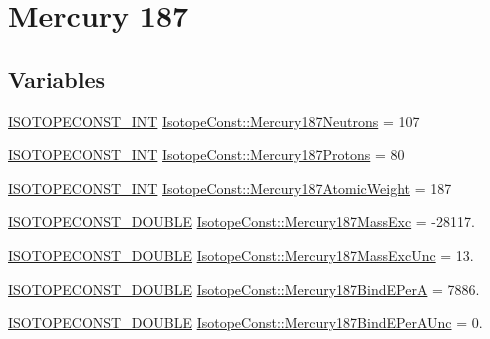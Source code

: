 \hypertarget{group___isotope_const-_mercury-_hg187}{}\section{Mercury 187}
\label{group___isotope_const-_mercury-_hg187}
\subsection*{Variables}
\begin{DoxyCompactItemize}
\item 
\mbox{\hyperlink{group___isotope_const-_macros_ga5f18360b3e99483a35c32d789e62621c}{I\+S\+O\+T\+O\+P\+E\+C\+O\+N\+S\+T\+\_\+\+I\+NT}} \mbox{\hyperlink{group___isotope_const-_mercury-_hg187_ga6da25b767476d7b3b2f1f6c7cd711c2e}{Isotope\+Const\+::\+Mercury187\+Neutrons}} = 107
\item 
\mbox{\hyperlink{group___isotope_const-_macros_ga5f18360b3e99483a35c32d789e62621c}{I\+S\+O\+T\+O\+P\+E\+C\+O\+N\+S\+T\+\_\+\+I\+NT}} \mbox{\hyperlink{group___isotope_const-_mercury-_hg187_gac385d06fb2cbb2e9d0995c0e034516f6}{Isotope\+Const\+::\+Mercury187\+Protons}} = 80
\item 
\mbox{\hyperlink{group___isotope_const-_macros_ga5f18360b3e99483a35c32d789e62621c}{I\+S\+O\+T\+O\+P\+E\+C\+O\+N\+S\+T\+\_\+\+I\+NT}} \mbox{\hyperlink{group___isotope_const-_mercury-_hg187_gab6f1dcde7994288182f1f4aaae670210}{Isotope\+Const\+::\+Mercury187\+Atomic\+Weight}} = 187
\item 
\mbox{\hyperlink{group___isotope_const-_macros_ga8f45a7272ce02c0b4c65c44636ed719a}{I\+S\+O\+T\+O\+P\+E\+C\+O\+N\+S\+T\+\_\+\+D\+O\+U\+B\+LE}} \mbox{\hyperlink{group___isotope_const-_mercury-_hg187_gad6df6a5d15f9ab12a9f1da59e5770c52}{Isotope\+Const\+::\+Mercury187\+Mass\+Exc}} = -\/28117.
\item 
\mbox{\hyperlink{group___isotope_const-_macros_ga8f45a7272ce02c0b4c65c44636ed719a}{I\+S\+O\+T\+O\+P\+E\+C\+O\+N\+S\+T\+\_\+\+D\+O\+U\+B\+LE}} \mbox{\hyperlink{group___isotope_const-_mercury-_hg187_gadb429b3b4caa662709a670186c8c8b1a}{Isotope\+Const\+::\+Mercury187\+Mass\+Exc\+Unc}} = 13.
\item 
\mbox{\hyperlink{group___isotope_const-_macros_ga8f45a7272ce02c0b4c65c44636ed719a}{I\+S\+O\+T\+O\+P\+E\+C\+O\+N\+S\+T\+\_\+\+D\+O\+U\+B\+LE}} \mbox{\hyperlink{group___isotope_const-_mercury-_hg187_ga44d8df5c557b3754a249da81de97259d}{Isotope\+Const\+::\+Mercury187\+Bind\+E\+PerA}} = 7886.
\item 
\mbox{\hyperlink{group___isotope_const-_macros_ga8f45a7272ce02c0b4c65c44636ed719a}{I\+S\+O\+T\+O\+P\+E\+C\+O\+N\+S\+T\+\_\+\+D\+O\+U\+B\+LE}} \mbox{\hyperlink{group___isotope_const-_mercury-_hg187_ga35f473f6374073f523f5252356e5e0a7}{Isotope\+Const\+::\+Mercury187\+Bind\+E\+Per\+A\+Unc}} = 0.

\end{DoxyCompactItemize}
